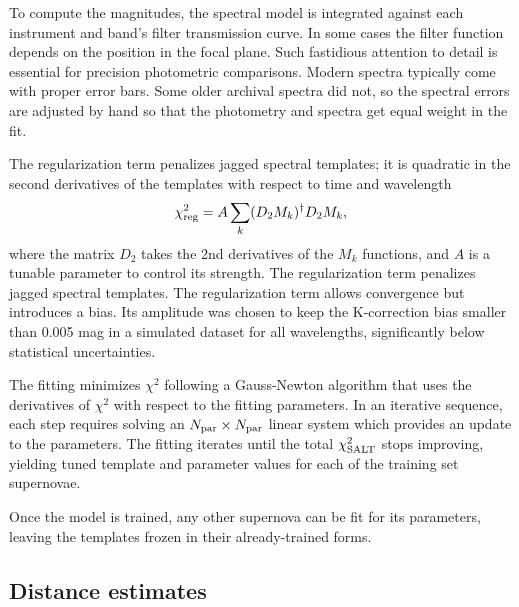 To compute the magnitudes, the spectral model is integrated against each instrument and band's filter transmission curve.  In some cases the filter function depends on the position in the focal plane.  Such fastidious attention to detail is essential for precision photometric comparisons.  Modern spectra typically come with proper error bars.  Some older archival spectra did not, so the spectral errors are adjusted by hand so that the photometry and spectra get equal weight in the fit.

The regularization term penalizes jagged spectral templates; it is quadratic in the second derivatives of the templates with respect to time and wavelength
\begin{equation}
  \chi^2_{\rm reg} = A \sum_k  (D_2 M_k)^\dag D_2 M_k, 
\end{equation}
where the matrix $D_2$ takes the 2nd derivatives of the $M_k$ functions, and $A$ is a tunable parameter to control its strength.
The regularization term penalizes jagged spectral templates.
The regularization term allows convergence but introduces a bias.  Its amplitude was chosen to keep the K-correction bias smaller than 0.005 mag in a simulated dataset for all wavelengths, significantly below statistical uncertainties.

The fitting minimizes $\chi^2$ following a Gauss-Newton algorithm that uses the derivatives of $\chi^2$ with respect to the fitting parameters.  In an iterative sequence, each step requires solving an $N_{\rm par} \times N_{\rm par}$ linear system which provides an update to the parameters.  The fitting iterates until the total $\chi^2_{\rm SALT}$ stops improving, yielding tuned template and parameter values for each of the training set supernovae.

Once the model is trained, any other supernova can be fit for its parameters, leaving the templates frozen in their already-trained forms.

\subsection{Distance estimates}

